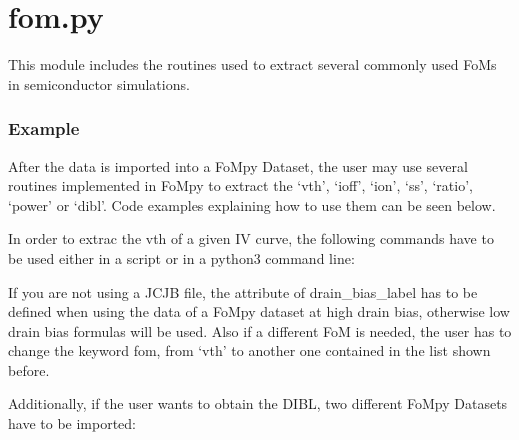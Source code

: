 \documentclass[letterpaper,10pt,english,openany, oneside]{sphinxmanual}
\begin{document}
\label{\detokenize{index:module-fompy.fom}}

\section{fom.py}
\label{\detokenize{index:fom-py}}
This module includes the routines used to extract several commonly used FoMs
in semiconductor simulations.
\subsubsection*{Example}

After the data is imported into a FoMpy Dataset, the user may use several routines implemented in FoMpy to extract the ‘vth’, ‘ioff’, ‘ion’, ‘ss’, ‘ratio’, ‘power’ or ‘dibl’. Code examples explaining how to use them can be seen below.

In order to extrac the vth of a given IV curve, the following commands have to be used either in a script or
in a python3 command line:

%
\begin{sphinxVerbatim}[commandchars=\\\{\}]
 
  
   
  
     
\end{sphinxVerbatim}

If you are not using a JCJB file, the attribute of drain\_bias\_label has to be defined when using the data of a FoMpy dataset at high drain bias, otherwise low drain bias formulas will be used.
Also if a different FoM is needed, the user has to change the keyword fom, from ‘vth’ to another one contained in the list shown before.

Additionally, if the user wants to obtain the DIBL, two different FoMpy Datasets have to be imported:
\end{document}
